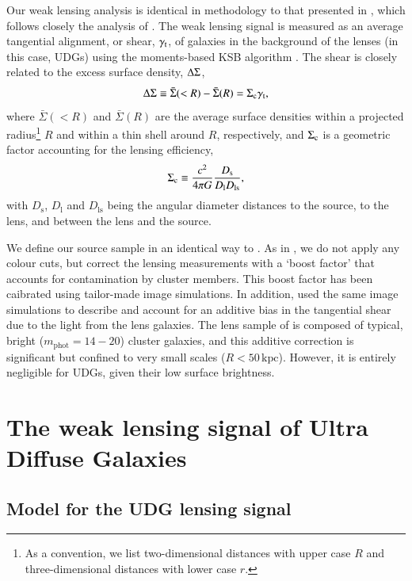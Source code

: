 \documentclass[usenatbib,fleqn]{mnras}
\begin{document}
Our weak lensing analysis is identical in methodology to that presented in \cite{sifon17}, which follows closely the analysis of \cite{hoekstra15}. The weak lensing signal is measured as an average tangential alignment, or shear, $\gamma_\mathrm{t}$, of galaxies in the background of the lenses (in this case, UDGs) using the moments-based KSB algorithm \citep{kaiser95,luppino97,hoekstra98}. The shear is closely related to the excess surface density, $\Delta\Sigma$, 
\begin{equation}
 \Delta\Sigma \equiv \bar\Sigma(<R) - \bar\Sigma(R) = \Sigma_\mathrm{c}\gamma_\mathrm{t},
\end{equation}
where $\bar\Sigma(<R)$ and $\bar\Sigma(R)$ are the average surface densities within a projected radius\footnote{As a convention, we list two-dimensional distances with upper case $R$ and three-dimensional distances with lower case $r$.} $R$ and within a thin shell around $R$, respectively, and $\Sigma_\mathrm{c}$ is a geometric factor accounting for the lensing efficiency,
\begin{equation}
 \Sigma_\mathrm{c} \equiv \frac{c^2}{4\pi G} \frac{D_\mathrm{s}}{D_\mathrm{l}D_\mathrm{ls}},
\end{equation}
with $D_\mathrm{s}$, $D_\mathrm{l}$ and $D_\mathrm{ls}$ being the angular diameter distances to the source, to the lens, and between the lens and the source.

We define our source sample in an identical way to \cite{sifon17}. As in \cite{sifon17}, we do not apply any colour cuts, but correct the lensing measurements with a `boost factor' that accounts for contamination by cluster members. This boost factor has been caibrated using tailor-made image simulations. In addition, \cite{sifon17} used the same image simulations to describe and account for an additive bias in the tangential shear due to the light from the lens galaxies. The lens sample of \cite{sifon17} is composed of typical, bright ($m_\mathrm{phot}=14-20$) cluster galaxies, and this additive correction is significant but confined to very small scales ($R<50\,\mathrm{kpc}$). However, it is entirely negligible for UDGs, given their low surface brightness.


\section{The weak lensing signal of Ultra Diffuse Galaxies}
\label{s:results}

\subsection{Model for the UDG lensing signal}
\end{document}
